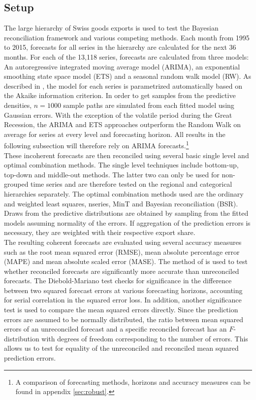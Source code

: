 \documentclass[a4paper,fleqn,11pt]{article}
\begin{document}
\subsection{Setup}
The large hierarchy of Swiss goods exports is used to test the Bayesian reconciliation framework and various competing methods. Each month from 1995 to 2015, forecasts for all series in the hierarchy are calculated for the next 36 months. For each of the 13,118 series, forecasts are calculated from three models: An autoregressive integrated moving average model (ARIMA), an exponential smoothing state space model (ETS) and a seasonal random walk model (RW). As described in \cite{Hyndman2008}, the model for each series is parametrized automatically based on the Akaike information criterion. In order to get samples from the predictive densities, $n = 1000$ sample paths are simulated from each fitted model using Gaussian errors. With the exception of the volatile period during the Great Recession, the ARIMA and ETS approaches outperform the Random Walk on average for series at every level and forecasting horizon. All results in the following subsection will therefore rely on ARIMA forecasts.\footnote{A comparison of forecasting methods, horizons and accuracy measures can be found in appendix \ref{sec:robust}.}\\

These incoherent forecasts are then reconciled using several basic single level and optimal combination methods. The single level techniques include bottom-up, top-down and middle-out methods. The latter two can only be used for non-grouped time series and are therefore tested on the regional and categorical hierarchies separately. The optimal combination methods used are the ordinary and weighted least squares, nseries, MinT and Bayesian reconciliation (BSR). Draws from the predictive distributions are obtained by sampling from the fitted models assuming normality of the errors. If aggregation of the prediction errors is necessary, they are weighted with their respective export share.\\

The resulting coherent forecasts are evaluated using several accuracy measures such as the root mean squared error (RMSE), mean absolute percentage error (MAPE) and mean absolute scaled error (MASE). The method of \cite{Diebold1995} is used to test whether reconciled forecasts are significantly more accurate than unreconciled forecasts. The Diebold-Mariano test checks for significance in the difference between two squared forecast errors at various forecasting horizons, accounting for serial correlation in the squared error loss. In addition, another significance test is used to compare the mean squared errors directly. Since the prediction errors are assumed to be normally distributed, the ratio between mean squared errors of an unreconciled forecast and a specific reconciled forecast has an $F$-distribution with degrees of freedom corresponding to the number of errors. This allows us to test for equality of the unreconciled and reconciled mean squared prediction errors.\\
\end{document}
